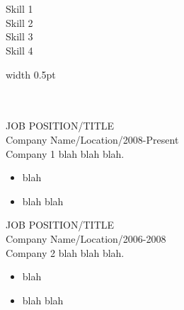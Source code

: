 \documentclass[12pt, a4paper, conference]{IEEEtran}
\newcommand{\borderthickness}{0.5pt}
\begin{document}
\begin{minipage}[t][5cm][t]{0.3\textwidth}
{}\\
\\
Skill 1\\

Skill 2\\

Skill 3\\

Skill 4

\end{minipage}
\quad
\textcolor{bordercolour}{\vrule height 4ex width \borderthickness}
\quad
\begin{minipage}[t][5cm][t]{0.6\textwidth}
{}\\
\\
JOB POSITION/TITLE\\
Company Name/Location/2008-Present\\
Company 1 blah blah blah.
\begin{itemize}
\item blah
\item blah blah\\
\end{itemize}

JOB POSITION/TITLE\\
Company Name/Location/2006-2008\\
Company 2 blah blah blah.
\begin{itemize}
\item blah
\item blah blah
\end{itemize}

\end{minipage}

\noindent\makebox[0cm]{\textcolor{bordercolour}{\rule{12.85cm}{\borderthickness}}}
\end{document}
